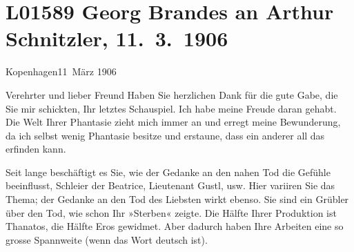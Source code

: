 

\section[Georg Brandes an Arthur Schnitzler, 11. 3. 1906]{L01589 Georg Brandes an Arthur Schnitzler, 11. 3. 1906}
\nopagebreak{}
\rehead{ }\normalsize\beginnumbering{}
\toendnotes[C]{\smallbreak\pagebreak[2]}
\toendnotes[C]{\smallbreak}
\pstart
           \raggedleft{}{\pb}Kopenhagen11 März 1906\pend
           
\pstart{}Verehrter und lieber Freund\pend\vspace{0.5em}
\pstart
           Haben Sie herzlichen Dank für die gute Gabe, die Sie mir schickten, Ihr letztes Schauspiel. Ich habe meine
               Freude daran gehabt. Die Welt Ihrer Phantasie zieht mich immer an und erregt meine
               Bewunderung, da ich selbst wenig Phantasie besitze und erstaune, dass ein anderer all
               das erfinden kann.\pend
           
\pstart
           Seit lange beschäftigt es Sie, wie der Gedanke an den nahen Tod die Gefühle
               beeinflusst, Schleier der Beatrice, Lieutenant Gustl, usw. Hier variiren Sie das
               Thema; der Gedanke an den Tod des Liebsten wirkt ebenso. Sie sind ein Grübler über
               den Tod, wie schon Ihr »Sterben« zeigte. Die
               Hälfte {\pb}Ihrer Produktion ist
               Thanatos, die Hälfte Eros gewidmet. Aber dadurch haben Ihre Arbeiten eine so grosse
               Spannweite (wenn das Wort deutsch ist).\pend
           
